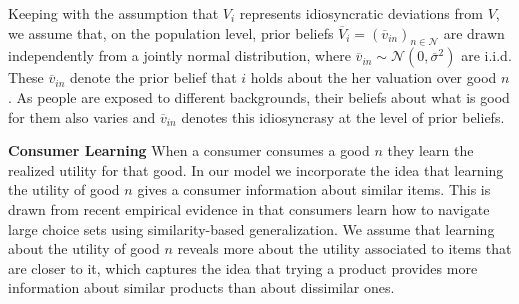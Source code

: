 \documentclass[sigconf]{acmart}
\begin{document}
Keeping with the assumption that $V_i$ represents idiosyncratic deviations from $V$, we assume that, on the population level, prior beliefs $\overline V_i=\left(\overline v_{in}\right)_{n \in \mathcal{N}}$ are drawn independently from a jointly normal distribution, where $\overline v_{in} \sim \mathcal N (0, \overline \sigma^2)$ are i.i.d. These $\overline v_{in}$ denote the prior belief that $i$ holds about the her valuation over good $n$. As people are exposed to different backgrounds, their beliefs about what is good for them also varies and $\overline v_{in}$ denotes this idiosyncrasy at the level of prior beliefs.
\par
\noindent \textbf{Consumer Learning}
When a consumer consumes a good $n$ they learn the realized utility for that good. In our model we incorporate the idea that learning the utility of good $n$ gives a consumer information about similar items. This is drawn from recent empirical evidence in \cite{schulz2019structured} that consumers learn how to navigate large choice sets using similarity-based generalization. We assume that learning about the utility of good $n$ reveals more about the utility associated to items that are closer to it, which captures the idea that trying a product provides more information about similar products than about dissimilar ones.
\end{document}
